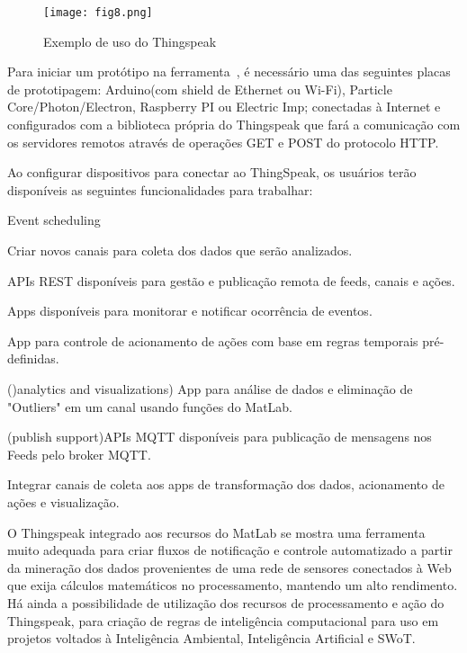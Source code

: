 	
	\begin{figure}[ht]
		\centering
		\texttt{[image: fig8.png]}
		\caption{Exemplo de uso do Thingspeak}
		\label{fig:arqthings}
	\end{figure}
	
	
	Para iniciar um prot\'otipo na ferramenta~\cite{KRISHNA2014}, \'e necess\'ario uma das seguintes placas de prototipagem: Arduino(com shield de Ethernet ou Wi-Fi), Particle Core/Photon/Electron, Raspberry PI ou Electric Imp; conectadas \`a Internet e configurados com a biblioteca pr\'opria do Thingspeak que far\'a a comunica\c{c}\~ao com os servidores remotos atrav\'es de opera\c{c}\~oes GET e POST do protocolo HTTP.
	
	Ao configurar dispositivos para conectar ao ThingSpeak, os usu\'arios ter\~ao dispon\'iveis as seguintes funcionalidades para trabalhar:
	\begin{labeling}{Event scheduling}
		\item[Data collection] Criar novos canais para coleta dos dados que ser\~ao analizados.
		\item[Open API] APIs REST dispon\'iveis para gest\~ao e publica\c{c}\~ao remota de feeds, canais e a\c{c}\~oes.
		\item[Alerts] Apps dispon\'iveis para monitorar e notificar ocorr\^encia de eventos.
		\item[Event scheduling] App para controle de acionamento de a\c{c}\~oes com base em regras temporais pr\'e-definidas.
		\item[MATLAB] ()analytics and visualizations) App para an\'alise de dados e elimina\c{c}\~ao de "Outliers" em um canal usando fun\c{c}\~oes do MatLab.
		\item[MQTT] (publish support)APIs MQTT dispon\'iveis para publica\c{c}\~ao de mensagens nos Feeds pelo broker MQTT.
		\item[App integrations] Integrar canais de coleta aos apps de transforma\c{c}\~ao dos dados, acionamento de a\c{c}\~oes e visualiza\c{c}\~ao.
	\end{labeling}
	
	O Thingspeak integrado aos recursos do MatLab se mostra uma ferramenta muito adequada para criar fluxos de notifica\c{c}\~ao e controle automatizado a partir da minera\c{c}\~ao dos dados provenientes de uma rede de sensores conectados \`a Web que exija c\'alculos matem\'aticos no processamento, mantendo um alto rendimento. H\'a ainda a possibilidade de utiliza\c{c}\~ao dos recursos de processamento e a\c{c}\~ao do Thingspeak, para cria\c{c}\~ao de regras de intelig\^encia computacional para uso em projetos voltados \`a Intelig\^encia Ambiental, Intelig\^encia Artificial e SWoT. 

